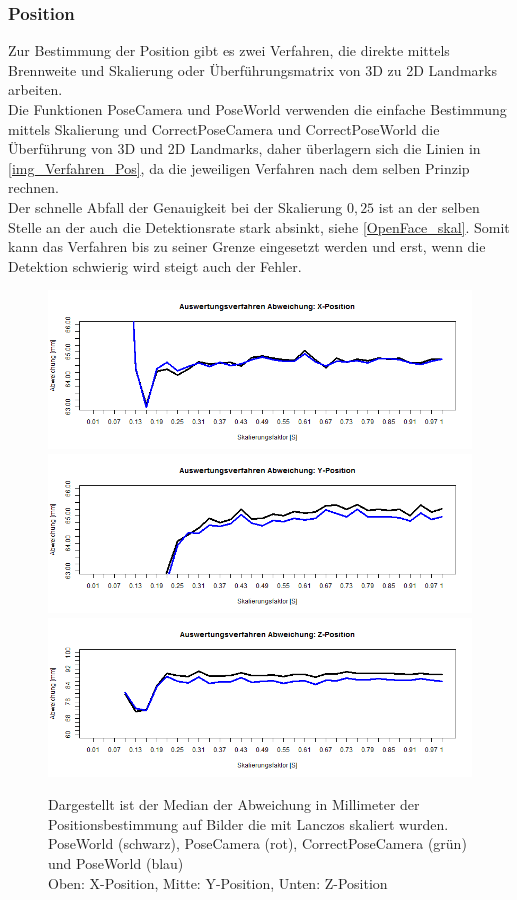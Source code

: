 \subsubsection{Position}
Zur Bestimmung der Position gibt es zwei Verfahren, die direkte mittels Brennweite und Skalierung oder Überführungsmatrix von 3D zu 2D Landmarks arbeiten.\\
Die Funktionen PoseCamera und PoseWorld verwenden die einfache Bestimmung mittels Skalierung und CorrectPoseCamera und CorrectPoseWorld die Überführung von 3D und 2D Landmarks, daher überlagern sich die Linien in \autoref{img_Verfahren_Pos}, da die jeweiligen Verfahren nach dem selben Prinzip rechnen.\\
Der schnelle Abfall der Genauigkeit bei der Skalierung $0,25$ ist an der selben Stelle an der auch die Detektionsrate stark absinkt, siehe \autoref{OpenFace_skal}. Somit kann das Verfahren bis zu seiner Grenze eingesetzt werden und erst, wenn die Detektion schwierig wird steigt auch der Fehler.
\begin{figure}
	\centering
	\includegraphics[width=\linewidth]{img_Skalierung/Verfahren_TX}
	\includegraphics[width=\linewidth]{img_Skalierung/Verfahren_TY}
	\includegraphics[width=\linewidth]{img_Skalierung/Verfahren_TZ}
	\caption{Dargestellt ist der Median der Abweichung in Millimeter der Positionsbestimmung auf Bilder die mit Lanczos skaliert wurden.\\
	PoseWorld (schwarz), PoseCamera (rot), CorrectPoseCamera (grün) und PoseWorld (blau)\\
	Oben: X-Position, Mitte: Y-Position, Unten: Z-Position}
	\label{img_Verfahren_Pos}
\end{figure}
